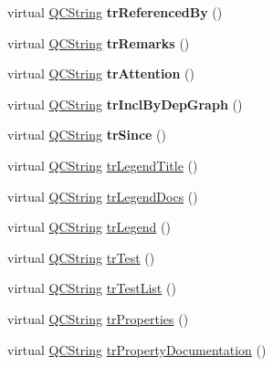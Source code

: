 \begin{DoxyCompactItemize}
virtual \mbox{\hyperlink{class_q_c_string}{Q\+C\+String}} {\bfseries tr\+Referenced\+By} ()
\item 
\mbox{\label{class_translator_norwegian_ad2e34e86d6d763c36b0d4dce48c2cbec}} 
virtual \mbox{\hyperlink{class_q_c_string}{Q\+C\+String}} {\bfseries tr\+Remarks} ()
\item 
\mbox{\label{class_translator_norwegian_a1147bbd6f05464b938edd73a40bdd13b}} 
virtual \mbox{\hyperlink{class_q_c_string}{Q\+C\+String}} {\bfseries tr\+Attention} ()
\item 
\mbox{\label{class_translator_norwegian_a9d6a4e85f910494d114f24b6a52f17a1}} 
virtual \mbox{\hyperlink{class_q_c_string}{Q\+C\+String}} {\bfseries tr\+Incl\+By\+Dep\+Graph} ()
\item 
\mbox{\label{class_translator_norwegian_a56784b7ec750172349c5450b8798f4d5}} 
virtual \mbox{\hyperlink{class_q_c_string}{Q\+C\+String}} {\bfseries tr\+Since} ()
\item 
virtual \mbox{\hyperlink{class_q_c_string}{Q\+C\+String}} \mbox{\hyperlink{class_translator_norwegian_ada178c4fca36d1dcd703f23e63c060f7}{tr\+Legend\+Title}} ()
\item 
virtual \mbox{\hyperlink{class_q_c_string}{Q\+C\+String}} \mbox{\hyperlink{class_translator_norwegian_aa9efd8f4b10cd329e4958461ac7d833a}{tr\+Legend\+Docs}} ()
\item 
virtual \mbox{\hyperlink{class_q_c_string}{Q\+C\+String}} \mbox{\hyperlink{class_translator_norwegian_ad360060e3c275b75a2bec2f3be9fcc51}{tr\+Legend}} ()
\item 
virtual \mbox{\hyperlink{class_q_c_string}{Q\+C\+String}} \mbox{\hyperlink{class_translator_norwegian_aba6cffeb4e885992b737208fec03e753}{tr\+Test}} ()
\item 
virtual \mbox{\hyperlink{class_q_c_string}{Q\+C\+String}} \mbox{\hyperlink{class_translator_norwegian_ad5130914a116936a9248503ee9e6a140}{tr\+Test\+List}} ()
\item 
virtual \mbox{\hyperlink{class_q_c_string}{Q\+C\+String}} \mbox{\hyperlink{class_translator_norwegian_aa2d4c267e5ca84066b1cca221a8cb22d}{tr\+Properties}} ()
\item 
virtual \mbox{\hyperlink{class_q_c_string}{Q\+C\+String}} \mbox{\hyperlink{class_translator_norwegian_a0ead09cbf04a98fa9e95244ff8264bae}{tr\+Property\+Documentation}} ()

\end{DoxyCompactItemize}
